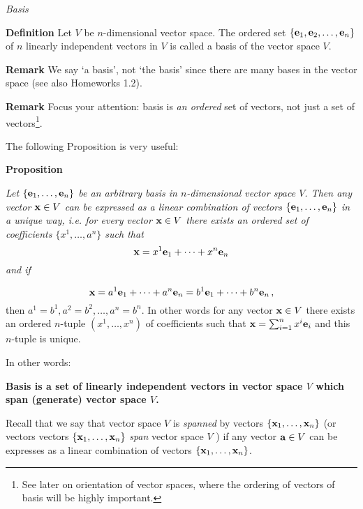 \documentclass[12pt]{article}
\numberwithin{equation}{section}
\begin{document}
\m


 
       \centerline {\it Basis}

 {\bf Definition}
 Let $V$ be $n$-dimensional vector space.  
The ordered set $\{{\bf e}_1,{\bf e}_2,\dots,{\bf e}_n\}$
 of $n$  linearly independent vectors in $V$ is called a 
basis of the vector space
 $V$.
\m

{\bf Remark}  We say `a basis', not `the basis' since there
 are many bases in the vector space (see also Homeworks 1.2).

{\bf Remark} Focus your attention: basis is  {\it an ordered} 
set of vectors, not just a set of vectors\footnote
{See later on orientation of vector spaces, where the ordering 
of vectors of basis
will be highly important.}.

The following Proposition is very useful:

 {\bf Proposition }
 {\it Let $\{{\bf e}_1,\dots,{\bf e}_n\}$ be an arbitrary basis 
in $n$-dimensional vector space $V$.
 Then any vector ${\bf x}\in V$ can be expressed as a 
linear combination of vectors
 $\{{\bf e}_1,\dots,{\bf e}_n\}$ in a unique way, i.e.
  for every vector ${\bf x}\in V$ there exists an 
ordered set of coefficients $\{x^1,\dots,a^n\}$ such that
                            \begin{equation}\label{expansionofvector}
      {\bf x}=x^1{\bf e}_1+\dots+x^n{\bf e}_n
                            \end{equation}
 and if

                      \begin{equation}\label{uniquenessofexpansion}
      {\bf x}=a^1{\bf e}_1+\dots+a^n{\bf e}_n=b^1{\bf e}_1+\dots+b^n{\bf e}_n\,,
                            \end{equation}
 then $a^1=b^1, a^2=b^2,\dots,a^n=b^n$. In other words
for any vector ${\bf x}\in V$ there exists an ordered $n$-tuple 
$(x^1,\dots,x^n)$ of coefficients
  such that  ${\bf x}=\sum_{i=1}^nx^i{\bf e}_i$  and this 
$n$-tuple is unique.}


\m

In other words:

 {\bf Basis is a set of  linearly independent
 vectors in vector space $V$ which span (generate) vector space   $V$.}

Recall that we say that vector space $V$  is 
{\it spanned} by vectors $\{{\bf x}_1,\dots,{\bf x}_n\}$
(or vectors vectors $\{{\bf x}_1,\dots,{\bf x}_n\}$ 
{\it span} vector space $V$ ) if any vector ${\bf a}\in V$
can be expresses as a linear combination of 
vectors $\{{\bf x}_1,\dots,{\bf x}_n\}$.
\end{document}
